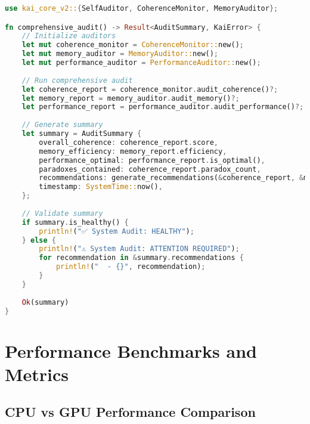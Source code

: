 \documentclass[11pt]{report}
\newcommand{\codebox}[2]{
  \begin{tcolorbox}[
    colback=gray!5,
    colframe=kai_blue,
    title=#1,
    fonttitle=\bfseries
  ]
  #2
  \end{tcolorbox}
}
\begin{document}
\codebox{Comprehensive Self-Auditing}{
\begin{lstlisting}[language=rust]
use kai_core_v2::{SelfAuditor, CoherenceMonitor, MemoryAuditor};

fn comprehensive_audit() -> Result<AuditSummary, KaiError> {
    // Initialize auditors
    let mut coherence_monitor = CoherenceMonitor::new();
    let mut memory_auditor = MemoryAuditor::new();
    let mut performance_auditor = PerformanceAuditor::new();
    
    // Run comprehensive audit
    let coherence_report = coherence_monitor.audit_coherence()?;
    let memory_report = memory_auditor.audit_memory()?;
    let performance_report = performance_auditor.audit_performance()?;
    
    // Generate summary
    let summary = AuditSummary {
        overall_coherence: coherence_report.score,
        memory_efficiency: memory_report.efficiency,
        performance_optimal: performance_report.is_optimal(),
        paradoxes_contained: coherence_report.paradox_count,
        recommendations: generate_recommendations(&coherence_report, &memory_report, &performance_report),
        timestamp: SystemTime::now(),
    };
    
    // Validate summary
    if summary.is_healthy() {
        println!("✅ System Audit: HEALTHY");
    } else {
        println!("⚠️ System Audit: ATTENTION REQUIRED");
        for recommendation in &summary.recommendations {
            println!("  - {}", recommendation);
        }
    }
    
    Ok(summary)
}
\end{lstlisting}
}

\chapter{Performance Benchmarks and Metrics}

\section{CPU vs GPU Performance Comparison}
\end{document}
